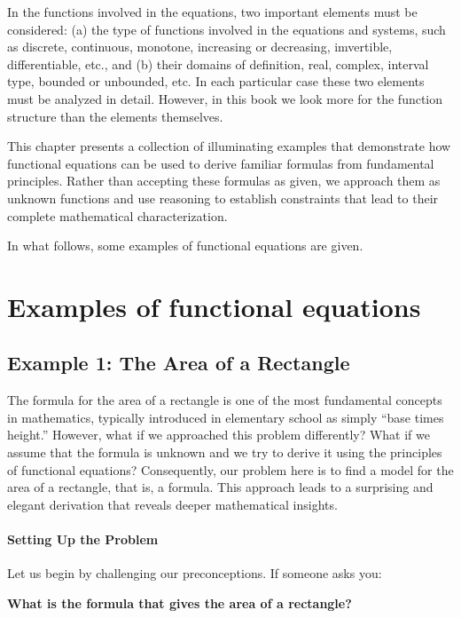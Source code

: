 In the functions involved in the equations, two important elements must be considered: (a) the type of functions involved in the equations and systems, such as discrete, continuous, monotone, increasing or decreasing, imvertible, differentiable, etc., and (b) their domains of definition, real, complex, interval type, bounded or unbounded, etc. In each particular case these two elements must be analyzed in detail. However, in this book we look more for the function structure than the elements themselves.

This chapter presents a collection of illuminating examples that demonstrate how functional equations can be used to derive familiar formulas from fundamental principles. Rather than accepting these formulas as given, we approach them as unknown functions and use reasoning to establish constraints that lead to their complete mathematical characterization.

In what follows, some examples of functional equations are given.

\section{Examples of functional equations}

\subsection{Example 1: The Area of a Rectangle}

The formula for the area of a rectangle is one of the most fundamental concepts in mathematics, typically introduced in elementary school as simply ``base times height.'' However, what if we approached this problem differently? What if we assume that the formula is unknown and we try to derive it using the principles of functional equations? Consequently, our problem here is to find a model for the area of a rectangle, that is, a formula. This approach leads to a surprising and elegant derivation that reveals deeper mathematical insights.

\paragraph{Setting Up the Problem}

Let us begin by challenging our preconceptions. If someone asks you:

\begin{center}
\textbf{What is the formula that gives the area of a rectangle?}
\end{center}

